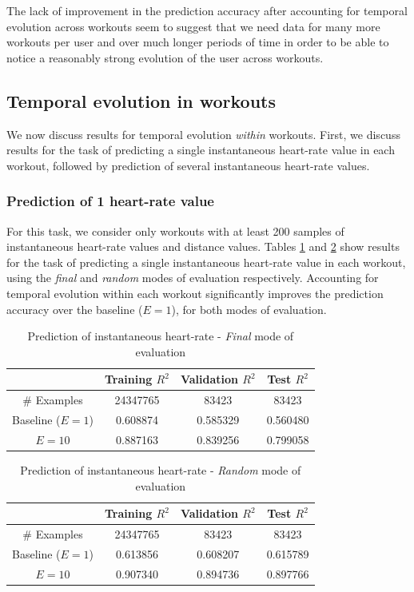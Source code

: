 \documentclass{acm_proc_article-sp}
\begin{document}
The lack of improvement in the prediction accuracy after accounting for temporal evolution across workouts seem to suggest that we need data for many more workouts per user and over much longer periods of time in order to be able to notice a reasonably strong evolution of the user across workouts.

\subsection{Temporal evolution in workouts}

We now discuss results for temporal evolution \emph{within} workouts. First, we discuss results for the task of predicting a single instantaneous heart-rate value in each workout, followed by prediction of several instantaneous heart-rate values.

\subsubsection{Prediction of 1 heart-rate value}

For this task, we consider only workouts with at least 200 samples of instantaneous heart-rate values and distance values. Tables \ref{tableInstHrFinal} and \ref{tableInstHrRandom} show results for the task of predicting a single instantaneous heart-rate value in each workout, using the \emph{final} and \emph{random} modes of evaluation respectively. Accounting for temporal evolution within each workout significantly improves the prediction accuracy over the baseline ($E = 1$), for both modes of evaluation.

\begin{table}[H]
\centering
\begin{tabular}{|c|c|c|c|} \hline
& Training $R^2$ & Validation $R^2$ & Test $R^2$ \\ \hline
\# Examples & 24347765 & 83423  & 83423  \\ \hline
Baseline ($E = 1$) & 0.608874 & 0.585329 & 0.560480 \\ \hline
$E = 10$ & 0.887163 & 0.839256 & 0.799058 \\ \hline
\end{tabular}
\caption{Prediction of instantaneous heart-rate - \emph{Final} mode of evaluation }
\label{tableInstHrFinal}
\end{table}

\begin{table}[H]
\centering
\begin{tabular}{|c|c|c|c|} \hline
& Training $R^2$ & Validation $R^2$ & Test $R^2$ \\ \hline
\# Examples & 24347765  & 83423  & 83423  \\ \hline
Baseline ($E = 1$) & 0.613856 & 0.608207 & 0.615789 \\ \hline
$E = 10$ & 0.907340 & 0.894736 & 0.897766 \\ \hline
\end{tabular}
\caption{Prediction of instantaneous heart-rate - \emph{Random} mode of evaluation }
\label{tableInstHrRandom}
\end{table}
\end{document}
